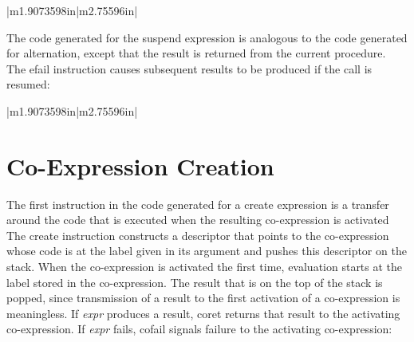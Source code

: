 \bigskip

\begin{center}
\tablelasttail{\hline}
\begin{xtabular}{|m{1.9073598in}|m{2.75596in}|}

\end{xtabular}
\end{center}

The code generated for the suspend expression is analogous to the code
generated for alternation, except that the result is returned from the
current procedure. The efail instruction causes subsequent results to
be produced if the call is resumed:

\begin{center}
\tablelasttail{\hline}
\begin{xtabular}{|m{1.9073598in}|m{2.75596in}|}

\end{xtabular}
\end{center}


\section{Co-Expression Creation}

The first instruction in the code generated for a create expression is
a transfer around the code that is executed when the resulting
co-expression is activated The create instruction constructs a
descriptor that points to the co-expression whose code is at the label
given in its argument and pushes this descriptor on the stack. When
the co-expression is activated the first time, evaluation starts at
the label stored in the co-expression. The result that is on the top
of the stack is popped, since transmission of a result to the first
activation of a co-expression is meaningless. If \textit{expr}
produces a result, coret returns that result to the activating
co-expression. If \textit{expr} fails, cofail signals failure to the
activating co-expression:


